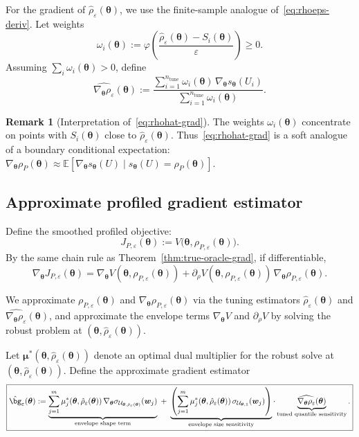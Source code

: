 \documentclass[11pt]{article}
\newcommand{\E}{\mathbb{E}}
\newcommand{\cU}{\mathcal{U}}
\newcommand{\btheta}{\bm{\theta}}
\newcommand{\bw}{\bm{w}}
\newcommand{\bmu}{\bm{\mu}}
\theoremstyle{plain}
\theoremstyle{definition}
\newtheorem{remark}[theorem]{Remark}
\begin{document}
For the gradient of $\hat\rho_{\varepsilon}(\btheta)$, we use the finite-sample analogue of~\eqref{eq:rhoeps-deriv}.
Let weights
\[
\omega_i(\btheta)
:=
\varphi\left(\frac{\hat\rho_{\varepsilon}(\btheta)-S_i(\btheta)}{\varepsilon}\right)\ge 0.
\]
Assuming $\sum_i \omega_i(\btheta)>0$, define
\begin{equation}\label{eq:rhohat-grad}
\widehat{\nabla_{\btheta}\rho_{\varepsilon}}(\btheta)
:=
\frac{\sum_{i=1}^{n_{\mathrm{tune}}}\omega_i(\btheta)\,\nabla_{\btheta}s_{\btheta}(U_i)}{\sum_{i=1}^{n_{\mathrm{tune}}}\omega_i(\btheta)}.
\end{equation}

\begin{remark}[Interpretation of~\eqref{eq:rhohat-grad}]
The weights $\omega_i(\btheta)$ concentrate on points with $S_i(\btheta)$ close to $\hat\rho_{\varepsilon}(\btheta)$.
Thus~\eqref{eq:rhohat-grad} is a soft analogue of a boundary conditional expectation:
$\nabla_{\btheta}\rho_P(\btheta)\approx \E[\nabla_{\btheta}s_{\btheta}(U)\mid s_{\btheta}(U)=\rho_P(\btheta)]$.
\end{remark}

\subsection{Approximate profiled gradient estimator}

Define the smoothed profiled objective:
\begin{equation}\label{eq:JPeps}
J_{P,\varepsilon}(\btheta)
:=
V\big(\btheta,\rho_{P,\varepsilon}(\btheta)\big).
\end{equation}
By the same chain rule as Theorem~\ref{thm:true-oracle-grad}, if differentiable,
\[
\nabla_{\btheta}J_{P,\varepsilon}(\btheta)
=
\nabla_{\btheta}V(\btheta,\rho_{P,\varepsilon}(\btheta))
+
\partial_{\rho}V(\btheta,\rho_{P,\varepsilon}(\btheta))\,
\nabla_{\btheta}\rho_{P,\varepsilon}(\btheta).
\]

We approximate $\rho_{P,\varepsilon}(\btheta)$ and $\nabla_{\btheta}\rho_{P,\varepsilon}(\btheta)$ via the tuning estimators
$\hat\rho_{\varepsilon}(\btheta)$ and $\widehat{\nabla_{\btheta}\rho_{\varepsilon}}(\btheta)$,
and approximate the envelope terms $\nabla_{\btheta}V$ and $\partial_\rho V$ by solving the robust problem at $(\btheta,\hat\rho_{\varepsilon}(\btheta))$.

Let $\bmu^*(\btheta,\hat\rho_{\varepsilon}(\btheta))$ denote an optimal dual multiplier for the robust solve at $(\btheta,\hat\rho_{\varepsilon}(\btheta))$.
Define the approximate gradient estimator
\begin{equation}\label{eq:ghat}
\boxed{
\hat{\bg}_{\varepsilon}(\btheta)
:=
\underbrace{\sum_{j=1}^m \mu_j^*(\btheta,\hat\rho_{\varepsilon}(\btheta))\,
\nabla_{\btheta}\sigma_{\cU_{\btheta,\hat\rho_{\varepsilon}(\btheta)}}(\bw_j)}_{\text{envelope shape term}}
\;+\;
\underbrace{\left(\sum_{j=1}^m \mu_j^*(\btheta,\hat\rho_{\varepsilon}(\btheta))\,\sigma_{\cU_{\btheta,1}}(\bw_j)\right)}_{\text{envelope size sensitivity}}
\cdot
\underbrace{\widehat{\nabla_{\btheta}\rho_{\varepsilon}}(\btheta)}_{\text{tuned quantile sensitivity}}.
}
\end{equation}
\end{document}
